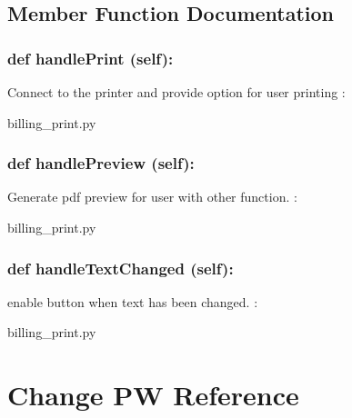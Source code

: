 \subsection{Member Function Documentation}
\hypertarget{class_poly_a14a7ad77ce612b0c54f531d307ee4b39}{
\subsubsection[{def handlePrint (self):}]{\setlength{\rightskip}{0pt plus 5cm}def {handlePrint} (self):}}\label{class_poly_a14a7ad77ce612b0c54f531d307ee4b39}
Connect to the printer and provide option for user printing
:\begin{DoxyCompactItemize}
\item 
billing\_print.\-py\end{DoxyCompactItemize}

\hypertarget{class_poly_a14a7ad77ce612b0c54f531d307ee4b39}{
\subsubsection[{def handlePreview (self):}]{\setlength{\rightskip}{0pt plus 5cm}def {handlePreview} (self):}}\label{class_poly_a14a7ad77ce612b0c54f531d307ee4b39}
Generate pdf preview for user with other function.
:\begin{DoxyCompactItemize}
\item 
billing\_print.\-py\end{DoxyCompactItemize}

\hypertarget{class_poly_a14a7ad77ce612b0c54f531d307ee4b39}{
\subsubsection[{def handleTextChanged (self):}]{\setlength{\rightskip}{0pt plus 5cm}def {handleTextChanged} (self):}}\label{class_poly_a14a7ad77ce612b0c54f531d307ee4b39}
enable button when text has been changed.
:\begin{DoxyCompactItemize}
\item 
billing\_print.\-py\end{DoxyCompactItemize}


\hypertarget{Change_PW}{\section{Change PW Reference}
\label{Change_PW}
}
